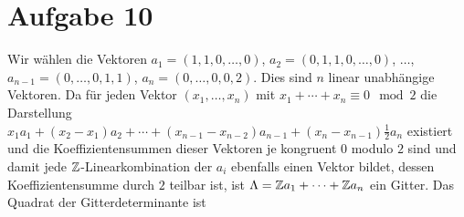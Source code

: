 \section*{Aufgabe 10}
Wir wählen die Vektoren $a_1 = (1, 1, 0, \dots, 0)$, $a_2 = (0, 1, 1, 0, \dots,
0)$, $\dots$, $a_{n-1} = (0, \dots, 0, 1, 1)$, $a_n = (0, \dots, 0, 0, 2)$.
Dies sind $n$ linear unabhängige Vektoren. Da für jeden Vektor $(x_1, \dots,
x_n)$ mit $x_1 + \cdots + x_n \equiv 0\mod 2$ die Darstellung $x_1 a_1 + (x_2 -
x_1) a_2 + \cdots + (x_{n-1} - x_{n-2}) a_{n-1} + (x_n - x_{n-1}) \frac{1}{2}
a_n$ existiert und die Koeffizientensummen dieser Vektoren je kongruent $0$
modulo $2$ sind und damit jede $\mathbb{Z}$-Linearkombination der $a_i$ ebenfalls einen
Vektor bildet, dessen Koeffizientensumme durch $2$ teilbar ist, ist $\Lambda =
\mathbb{Z} a_1 + \cdots + \mathbb{Z} a_n$ ein Gitter. Das Quadrat der Gitterdeterminante ist
